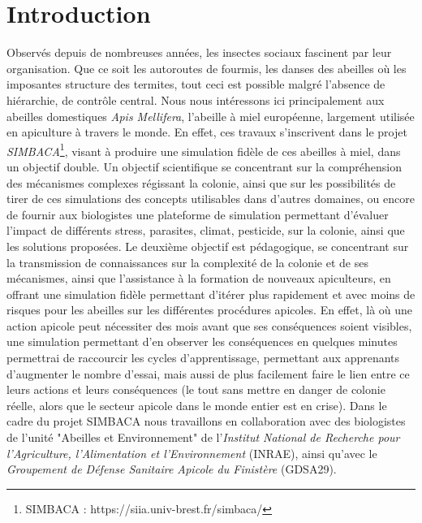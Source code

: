 \chapter*{Introduction}


	Observés depuis de nombreuses années, les insectes sociaux fascinent par leur organisation. Que ce soit les autoroutes de fourmis, les danses des abeilles où les imposantes structure des termites, tout ceci est possible malgré l'absence de hiérarchie, de contrôle central. Nous nous intéressons ici principalement aux abeilles domestiques \textit{Apis Mellifera}, l'abeille à miel européenne, largement utilisée en apiculture à travers le monde. 
	En effet, ces travaux s'inscrivent dans le projet \textit{SIMBACA}\footnote{SIMBACA : https://siia.univ-brest.fr/simbaca/}, visant à produire une simulation fidèle de ces abeilles à miel, dans un objectif double. Un objectif scientifique se concentrant sur la compréhension des mécanismes complexes régissant la colonie, ainsi que sur les possibilités de tirer de ces simulations des concepts utilisables dans d'autres domaines, ou encore de fournir aux biologistes une plateforme de simulation permettant d'évaluer l'impact de différents stress, parasites, climat, pesticide, sur la colonie, ainsi que les solutions proposées. 
	Le deuxième objectif est pédagogique, se concentrant sur la transmission de connaissances sur la complexité de la colonie et de ses mécanismes, ainsi que l'assistance à la formation de nouveaux apiculteurs, en offrant une simulation fidèle permettant d'itérer plus rapidement et avec moins de risques pour les abeilles sur les différentes procédures apicoles. En effet, là où une action apicole peut nécessiter des mois avant que ses conséquences soient visibles, une simulation permettant d'en observer les conséquences en quelques minutes permettrai de raccourcir les cycles d'apprentissage, permettant aux apprenants d'augmenter le nombre d'essai, mais aussi de plus facilement faire le lien entre ce leurs actions et leurs conséquences (le tout sans mettre en danger de colonie réelle, alors que le secteur apicole dans le monde entier est en crise\cite{johnson_honey_2010}). Dans le cadre du projet SIMBACA nous travaillons en collaboration avec des biologistes de l'unité "Abeilles et Environnement" de l'\textit{Institut National de Recherche pour l'Agriculture, l'Alimentation et l'Environnement} (INRAE), ainsi qu'avec le \textit{Groupement de Défense Sanitaire Apicole du Finistère} (GDSA29).

